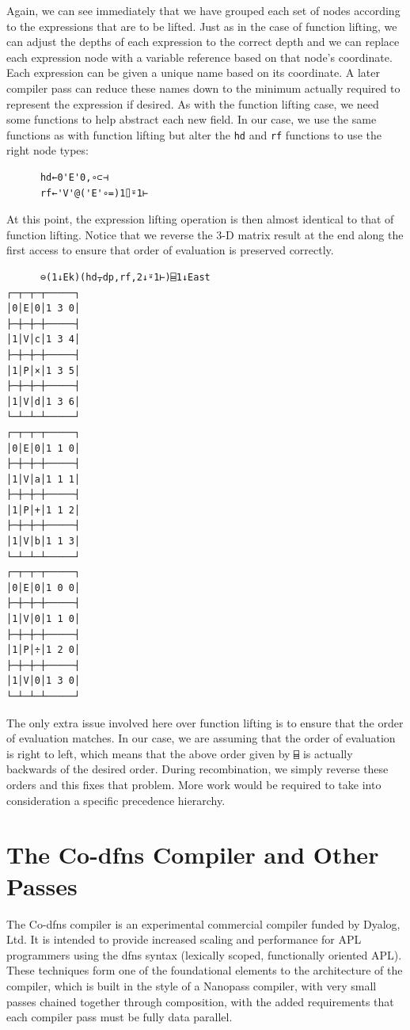 ﻿\documentclass[numbers,10pt,preprint]{sigplanconf}
\begin{document}
\noindent Again, we can see immediately that we have grouped each set of nodes according to the expressions that are to be lifted. Just as in the case of function lifting, we can adjust the depths of each expression to the correct depth and we can replace each expression node with a variable reference based on that node’s coordinate. Each expression can be given a unique name based on its coordinate. A later compiler pass can reduce these names down to the minimum actually required to represent the expression if desired. As with the function lifting case, we need some functions to help abstract each new field. In our case, we use the same functions as with function lifting but alter the \verb;hd; and \verb;rf; functions to use the right node types:

\begin{verbatim}
      hd←0'E'0,∘⊂⊣
      rf←'V'@('E'∘=)1⌷⍤1⊢
\end{verbatim}

\noindent At this point, the expression lifting operation is then almost identical to that of function lifting. Notice that we reverse the 3-D matrix result at the end along the first access to ensure that order of evaluation is preserved correctly. 

\begin{verbatim}
      ⊖(1↓Ek)(hd⍪dp,rf,2↓⍤1⊢)⌸1↓East
┌─┬─┬─┬─────┐
│0│E│0│1 3 0│
├─┼─┼─┼─────┤
│1│V│c│1 3 4│
├─┼─┼─┼─────┤
│1│P│×│1 3 5│
├─┼─┼─┼─────┤
│1│V│d│1 3 6│
└─┴─┴─┴─────┘
┌─┬─┬─┬─────┐
│0│E│0│1 1 0│
├─┼─┼─┼─────┤
│1│V│a│1 1 1│
├─┼─┼─┼─────┤
│1│P│+│1 1 2│
├─┼─┼─┼─────┤
│1│V│b│1 1 3│
└─┴─┴─┴─────┘
┌─┬─┬─┬─────┐
│0│E│0│1 0 0│
├─┼─┼─┼─────┤
│1│V│0│1 1 0│
├─┼─┼─┼─────┤
│1│P│÷│1 2 0│
├─┼─┼─┼─────┤
│1│V│0│1 3 0│
└─┴─┴─┴─────┘
\end{verbatim}

The only extra issue involved here over function lifting is to ensure that the order of evaluation matches. In our case, we are assuming that the order of evaluation is right to left, which means that the above order given by \verb;⌸; is actually backwards of the desired order. During recombination, we simply reverse these orders and this fixes that problem. More work would be required to take into consideration a specific precedence hierarchy.

\section{The Co-dfns Compiler and Other Passes}

The Co-dfns compiler is an experimental commercial compiler funded by Dyalog, Ltd. \cite{hsu2014co,hsu2015accelerating} It is intended to provide increased scaling and performance for APL programmers using the dfns syntax (lexically scoped, functionally oriented APL). These techniques form one of the foundational elements to the architecture of the compiler, which is built in the style of a Nanopass \cite{keep2013nanopass} compiler, with very small passes chained together through composition, with the added requirements that each compiler pass must be fully data parallel.
\end{document}

